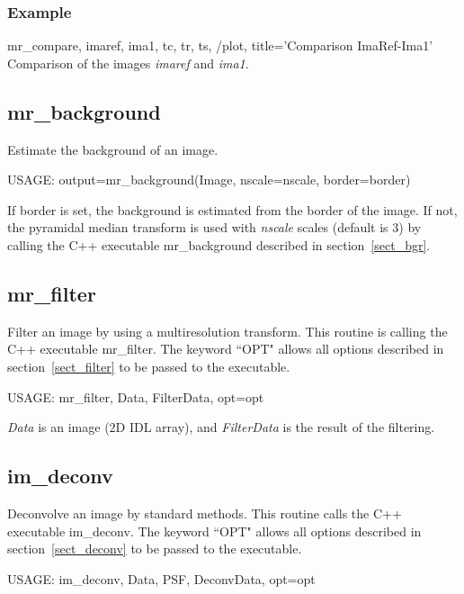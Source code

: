 \subsubsection*{Example}
mr\_compare, imaref, ima1, tc, tr, ts, /plot, title='Comparison ImaRef-Ima1'\\
Comparison of the images {\em imaref} and {\em ima1}.


\subsection{mr\_background}
Estimate the background of an image. 
{\bf
\begin{center}
     USAGE:  output=mr\_background(Image, nscale=nscale, border=border)
\end{center}}
If {\rm border} is set, the background is estimated from the border of
the image. If not, the pyramidal median transform is used with {\em nscale}
scales (default is 3) by calling the C++ executable {mr\_background} described in section~\ref{sect_bgr}.


\subsection{mr\_filter}
Filter  an image by using a multiresolution transform. 
This routine is calling the C++ executable {mr\_filter}. The keyword 
``OPT" allows 
all options described in section~\ref{sect_filter}
to be passed to the executable.

{\bf
\begin{center}
     USAGE: mr\_filter, Data, FilterData, opt=opt
\end{center}}
{\em Data} is an image (2D IDL array), and {\em FilterData} is the result
of the filtering.

\subsection{im\_deconv}
Deconvolve an image by standard methods. This routine calls 
the C++ executable {im\_deconv}. The keyword ``OPT" 
allows 
all options described in section~\ref{sect_deconv} to be passed 
to the executable.

{\bf
\begin{center}
     USAGE: im\_deconv, Data, PSF, DeconvData, opt=opt
\end{center}}
